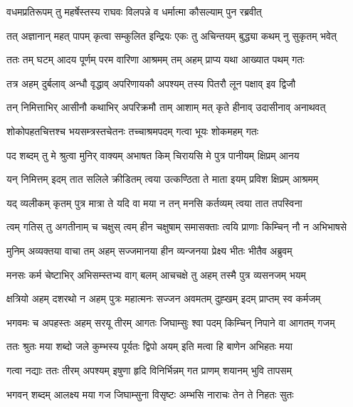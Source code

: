 
\twolineshloka
{वधमप्रतिरूपम् तु महर्षेस्तस्य राघवः}
{विलपन्ने व धर्मात्मा कौसल्याम् पुन रब्रवीत्} %

\twolineshloka
{तत् अज्ञानान् महत् पापम् कृत्वा सम्कुलित इन्द्रियः}
{एकः तु अचिन्तयम् बुद्ध्या कथम् नु सुकृतम् भवेत्} %

\twolineshloka
{ततः तम् घटम् आदय पूर्णम् परम वारिणा}
{आश्रमम् तम् अहम् प्राप्य यथा आख्यात पथम् गतः} %

\twolineshloka
{तत्र अहम् दुर्बलाव् अन्धौ वृद्धाव् अपरिणायकौ}
{अपश्यम् तस्य पितरौ लून पक्षाव् इव द्विजौ} %

\twolineshloka
{तन् निमित्ताभिर् आसीनौ कथाभिर् अपरिक्रमौ}
{ताम् आशाम् मत् कृते हीनाव् उदासीनाव् अनाथवत्} %

\twolineshloka
{शोकोपहतचित्तश्च भयसम्त्रस्तचेतनः}
{तच्चाश्रमपदम् गत्वा भूयः शोकमहम् गतः} %

\twolineshloka
{पद शब्दम् तु मे श्रुत्वा मुनिर् वाक्यम् अभाषत}
{किम् चिरायसि मे पुत्र पानीयम् क्षिप्रम् आनय} %

\twolineshloka
{यन् निमित्तम् इदम् तात सलिले क्रीडितम् त्वया}
{उत्कण्ठिता ते माता इयम् प्रविश क्षिप्रम् आश्रमम्} %

\twolineshloka
{यद् व्यलीकम् कृतम् पुत्र मात्रा ते यदि वा मया}
{न तन् मनसि कर्तव्यम् त्वया तात तपस्विना} %

\twolineshloka
{त्वम् गतिस् तु अगतीनाम् च चक्षुस् त्वम् हीन चक्षुषाम्}
{समासक्ताः त्वयि प्राणाः किम्चिन् नौ न अभिभाषसे} %

\twolineshloka
{मुनिम् अव्यक्तया वाचा तम् अहम् सज्जमानया}
{हीन व्यन्जनया प्रेक्ष्य भीतः भीतैव अब्रुवम्} %

\twolineshloka
{मनसः कर्म चेष्टाभिर् अभिसम्स्तभ्य वाग् बलम्}
{आचचक्षे तु अहम् तस्मै पुत्र व्यसनजम् भयम्} %

\twolineshloka
{क्षत्रियो अहम् दशरथो न अहम् पुत्रः महात्मनः}
{सज्जन अवमतम् दुह्खम् इदम् प्राप्तम् स्व कर्मजम्} %

\twolineshloka
{भगवमः च अपहस्तः अहम् सरयू तीरम् आगतः}
{जिघाम्सुः श्वा पदम् किम्चिन् निपाने वा आगतम् गजम्} %

\twolineshloka
{ततः श्रुतः मया शब्दो जले कुम्भस्य पूर्यतः}
{द्विपो अयम् इति मत्वा हि बाणेन अभिहतः मया} %

\twolineshloka
{गत्वा नद्याः ततः तीरम् अपश्यम् इषुणा हृदि}
{विनिर्भिन्नम् गत प्राणम् शयानम् भुवि तापसम्} %

\twolineshloka
{भगवन् शब्दम् आलक्ष्य मया गज जिघाम्सुना}
{विसृष्टः अम्भसि नाराचः तेन ते निहतः सुतः} %

